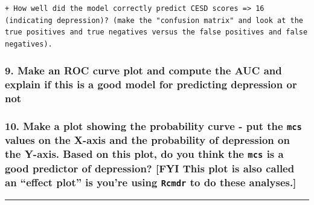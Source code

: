 \documentclass[10pt,letterpaper]{article}
\begin{document}
\begin{verbatim}
+ How well did the model correctly predict CESD scores => 16 (indicating depression)? (make the "confusion matrix" and look at the true positives and true negatives versus the false positives and false negatives).
\end{verbatim}

\subsubsection{9. Make an ROC curve plot and compute the AUC and explain
if this is a good model for predicting depression or
not}\label{make-an-roc-curve-plot-and-compute-the-auc-and-explain-if-this-is-a-good-model-for-predicting-depression-or-not}

\subsubsection{\texorpdfstring{10. Make a plot showing the probability
curve - put the \texttt{mcs} values on the X-axis and the probability of
depression on the Y-axis. Based on this plot, do you think the
\texttt{mcs} is a good predictor of depression? {[}\textbf{FYI} This
plot is also called an ``effect plot'' is you're using \texttt{Rcmdr} to
do these
analyses.{]}}{10. Make a plot showing the probability curve - put the mcs values on the X-axis and the probability of depression on the Y-axis. Based on this plot, do you think the mcs is a good predictor of depression? {[}FYI This plot is also called an effect plot is you're using Rcmdr to do these analyses.{]}}}\label{make-a-plot-showing-the-probability-curve---put-the-mcs-values-on-the-x-axis-and-the-probability-of-depression-on-the-y-axis.-based-on-this-plot-do-you-think-the-mcs-is-a-good-predictor-of-depression-fyi-this-plot-is-also-called-an-effect-plot-is-youre-using-rcmdr-to-do-these-analyses.}

\begin{center}\rule{0.5\linewidth}{\linethickness}\end{center}

\nolinenumbers
\end{document}

